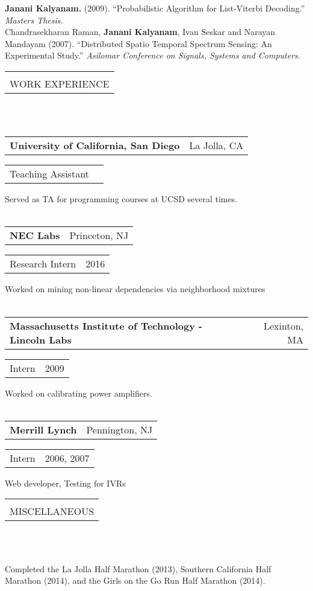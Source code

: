 \documentclass[11pt]{article}
\makeatletter
\newcommand{\secheader}[1]{

  {\begin{tabularx}{\textwidth}{@{}X}
    \midrule[0.095em] \\ \addlinespace[-1.2em]
     \uppercase{\large{#1}} \\
  \end{tabularx}\hfill\\\\}
}
\newcommand{\itemplaceheader}[2]{
  {\begin{tabular*}{\textwidth}{%
        @{\extracolsep{\fill}}%
        @{}l@{}%
        @{}r@{}}
      \textbf{#1} & {#2}
  \end{tabular*}}
}
\newcommand{\itempositionheader}[2]{
  {\setlength{\tabcolsep}{0em}
    \begin{tabular*}{\textwidth}{%
        @{\extracolsep{\fill}}
        @{}l@{}%
        @{}r@{}}
      \textrm{#1} & \textrm{#2}
  \end{tabular*}}
}
\makeatother
\begin{document}
\textbf{Janani Kalyanam.}  (2009).
``Probabilistic Algorithm for List-Viterbi Decoding.''
\textit{Masters Thesis.} \\

Chandrasekharan Raman, \textbf{Janani Kalyanam}, Ivan Seskar and Narayan Mandayam (2007).
``Distributed Spatio Temporal Spectrum Sensing:  An Experimental Study.''
\textit{Asilomar Conference on Signals, Systems and Computers.} \\

\secheader{Work Experience}
\itemplaceheader{University of California, San Diego}{La Jolla, CA}
\itempositionheader{Teaching Assistant}{}
Served as TA for programming courses at UCSD several times.\\ 
\hfill \\
\itemplaceheader{NEC Labs}{Princeton, NJ}
\itempositionheader{Research Intern}{2016}
Worked on mining non-linear dependencies via neighborhood mixtures \\ 
\hfill \\
\itemplaceheader{Massachusetts Institute of Technology - Lincoln Labs}{Lexinton, MA}
\itempositionheader{Intern}{2009}
Worked on calibrating power amplifiers. \\ 
\hfill \\
\itemplaceheader{Merrill Lynch}{Pennington, NJ}
\itempositionheader{Intern}{2006, 2007}
Web developer, Testing for IVRs \\

\secheader{Miscellaneous}
Completed the La Jolla Half Marathon (2013), Southern California Half Marathon (2014), and
the Girls on the Go Run Half Marathon (2014).
\end{document}
